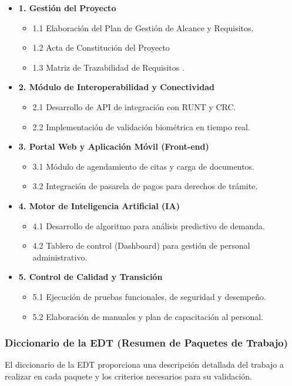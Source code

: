 \begin{itemize}
    \item \textbf{1. Gestión del Proyecto}         \begin{itemize}
            \item 1.1 Elaboración del Plan de Gestión de Alcance y Requisitos.
            \item 1.2 Acta de Constitución del Proyecto 
            \item 1.3 Matriz de Trazabilidad de Requisitos .
        \end{itemize}
    \item \textbf{2. Módulo de Interoperabilidad y Conectividad}
        \begin{itemize}
            \item 2.1 Desarrollo de API de integración con RUNT y CRC.
            \item 2.2 Implementación de validación biométrica en tiempo real.
        \end{itemize}
    \item \textbf{3. Portal Web y Aplicación Móvil (Front-end)}
        \begin{itemize}
            \item 3.1 Módulo de agendamiento de citas y carga de documentos.
            \item 3.2 Integración de pasarela de pagos para derechos de trámite.
        \end{itemize}
    \item \textbf{4. Motor de Inteligencia Artificial (IA)}
        \begin{itemize}
            \item 4.1 Desarrollo de algoritmo para análisis predictivo de demanda.
            \item 4.2 Tablero de control (Dashboard) para gestión de personal administrativo.
        \end{itemize}
    \item \textbf{5. Control de Calidad y Transición}
        \begin{itemize}
            \item 5.1 Ejecución de pruebas funcionales, de seguridad y desempeño.
            \item 5.2 Elaboración de manuales y plan de capacitación al personal.
        \end{itemize}
\end{itemize}

\subsubsection{Diccionario de la EDT (Resumen de Paquetes de Trabajo)}
El diccionario de la EDT proporciona una descripción detallada del trabajo a realizar en cada paquete y los criterios necesarios para su validación.

